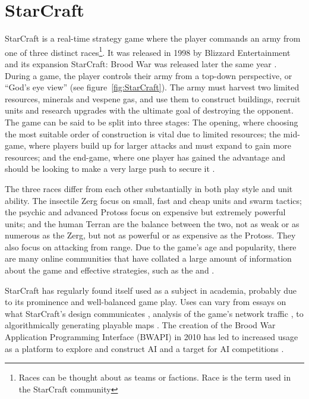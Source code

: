 \documentclass[11pt,openright,a4paper]{report}
\begin{document}
\section{StarCraft}
\label{StarCraft}
StarCraft is a real-time strategy game where the player commands an army from one of three distinct races\footnote{Races can be thought about as teams or factions. Race is the term used in the StarCraft community}. It was released in 1998 by Blizzard Entertainment and its expansion StarCraft: Brood War was released later the same year \cite{Blizzard}. During a game, the player controls their army from a top-down perspective, or ``God's eye view'' (see figure~\ref{fig:StarCraft}). The army must harvest two limited resources, minerals and vespene gas, and use them to construct buildings, recruit units and research upgrades with the ultimate goal of destroying the opponent. The game can be said to be split into three stages: The opening, where choosing the most suitable order of construction is vital due to limited resources; the mid-game, where players build up for larger attacks and must expand to gain more resources; and the end-game, where one player has gained the advantage and should be looking to make a very large push to secure it \cite{yi2011adaptive}.

The three races differ from each other substantially in both play style and unit ability. The insectile Zerg focus on small, fast and cheap units and swarm tactics; the psychic and advanced Protoss focus on expensive but extremely powerful units; and the human Terran are the balance between the two, not as weak or as numerous as the Zerg, but not as powerful or as expensive as the Protoss. They also focus on attacking from range.  Due to the game's age and popularity, there are many online communities that have collated a large amount of information about the game and effective strategies, such as the  and .

StarCraft has regularly found itself used as a subject in academia, probably due to its prominence and well-balanced game play.  Uses can vary from essays on what StarCraft's design communicates \cite{galloway2007starcraft}, analysis of the game's network traffic \cite{dainotti2005packet}, to algorithmically generating playable maps \cite{togelius2010multiobjective}. The creation of the Brood War Application Programming Interface (BWAPI) in 2010 \cite{bwapiMain} has led to increased usage as a platform to explore and construct AI and a target for AI competitions \cite{bwapiCompetitions}.
\end{document}

